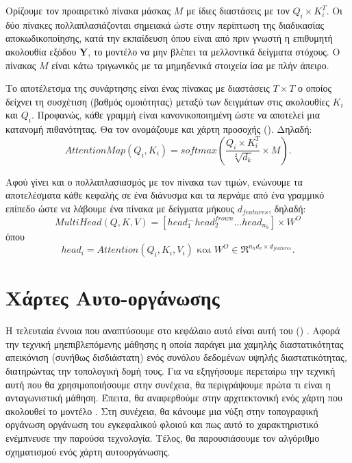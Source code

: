   Ορίζουμε τον προαιρετικό πίνακα μάσκας $M$ με ίδιες διαστάσεις με τον $Q_i\times K_i^T$. Οι δύο πίνακες πολλαπλασιάζονται σημειακά ώστε στην περίπτωση της διαδικασίας αποκωδικοποίησης, κατά την εκπαίδευση όπου είναι από πριν γνωστή η επιθυμητή ακολουθία εξόδου $\boldsymbol{Y}$, το μοντέλο να μην βλέπει τα μελλοντικά δείγματα στόχους. Ο πίνακας $M$ είναι κάτω τριγωνικός με τα μη\textendash μηδενικά στοιχεία ίσα με πλήν άπειρο.\par
  
  Το αποτέλετσμα της συνάρτησης  είναι ένας πίνακας με διαστάσεις $T \times T$ ο οποίος δείχνει τη συσχέτιση (βαθμός ομοιότητας) μεταξύ των δειγμάτων στις ακολουθίες $K_i$ και $Q_i$. Προφανώς, κάθε γραμμή είναι κανονικοποιημένη ώστε να αποτελεί μια κατανομή πιθανότητας. Θα τον ονομάζουμε και χάρτη προσοχής (). Δηλαδή:
  \[
    AttentionMap(Q_i, K_i) = softmax(\frac{Q_i\times K_i^T}{\sqrt[2]{d_k}} \times M).
    \]
  
  Αφού γίνει και ο πολλαπλασιασμός με τον πίνακα των τιμών, ενώνουμε τα αποτελέσματα κάθε κεφαλής σε ένα διάνυσμα και τα περνάμε από ένα γραμμικό επίπεδο ώστε να λάβουμε ένα πίνακα με δείγματα μήκους $d_{features}$, δηλαδή: 
  \begin{equation}
    MultiHead(Q, K, V) = [ head_1^{\frown}head_2^{frown}\dots head_{n_h} ] \times W^O
  \end{equation}
  όπου 
  \[
    head_i = Attention(Q_i, K_i, V_i) \text{ και } W^O \in \Re^{n_h d_v \times d_{features}}.
  \]



 

\section{Χάρτες Αυτο-οργάνωσης}
\label{sec:_SOM}
Η τελευταία έννοια που αναπτύσουμε στο κεφάλαιο αυτό είναι αυτή του  () \cite{kohonen1982self, kohonen1990self}. Αφορά την τεχνική μη\textendash επιβλεπόμενης μάθησης η οποία παράγει μια χαμηλής διαστατικότητας απεικόνιση (συνήθως δισδιάστατη) ενός συνόλου δεδομένων υψηλής διαστατικότητας, διατηρώντας την τοπολογική δομή τους. Για να εξηγήσουμε περεταίρω την τεχνική αυτή που θα χρησιμοποιήσουμε στην συνέχεια, θα περιγράψουμε πρώτα τι είναι η ανταγωνιστική μάθηση. Έπειτα, θα αναφερθούμε στην αρχιτεκτονική ενός χάρτη που ακολουθεί το μοντέλο . Στη συνέχεια, θα κάνουμε μια νύξη στην τοπογραφική οργάνωση οργάνωση του εγκεφαλικού φλοιού και πως αυτό το χαρακτηριστικό ενέμπνευσε την παρούσα τεχνολογία. Τέλος, θα παρουσιάσουμε τον αλγόριθμο σχηματισμού ενός χάρτη αυτο\textendash οργάνωσης.

